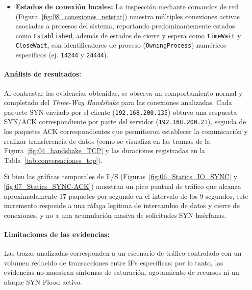\begin{itemize}
    \item \textbf{Estados de conexión locales:} La inspección mediante comandos de red (Figura~\ref{fig:08_conexiones_netstat}) muestra múltiples conexiones activas asociadas a procesos del sistema, reportando predominantemente estados como \texttt{Established}, además de estados de cierre y espera como \texttt{TimeWait} y \texttt{CloseWait}, con identificadores de proceso (\texttt{OwningProcess}) numéricos específicos (ej. \texttt{14244} y \texttt{24444}).
\end{itemize}

\paragraph{Análisis de resultados:}
Al contrastar las evidencias obtenidas, se observa un comportamiento normal y completado del \textit{Three-Way Handshake} para las conexiones analizadas. Cada paquete SYN enviado por el cliente (\texttt{192.168.200.135}) obtuvo una respuesta SYN/ACK correspondiente por parte del servidor (\texttt{192.168.200.21}), seguida de los paquetes ACK correspondientes que permitieron establecer la comunicación y realizar transferencia de datos (como se visualiza en las tramas de la Figura~\ref{fig:04_handshake_TCP} y las duraciones registradas en la Tabla~\ref{tab:conversaciones_tcp}). \newline

Si bien las gráficas temporales de E/S (Figuras~\ref{fig:06_Statics_IO_SYNC} y \ref{fig:07_Statics_SYNC-ACK}) muestran un pico puntual de tráfico que alcanza aproximadamente 17 paquetes por segundo en el intervalo de los 9 segundos, este incremento responde a una ráfaga legítima de intercambio de datos y cierre de conexiones, y no a una acumulación masiva de solicitudes SYN huérfanas. \newline
\paragraph{Limitaciones de las evidencias:} Las trazas analizadas corresponden a un escenario de tráfico controlado con un volumen reducido de transacciones entre IPs específicas; por lo tanto, las evidencias no muestran síntomas de saturación, agotamiento de recursos ni un ataque SYN Flood activo.

